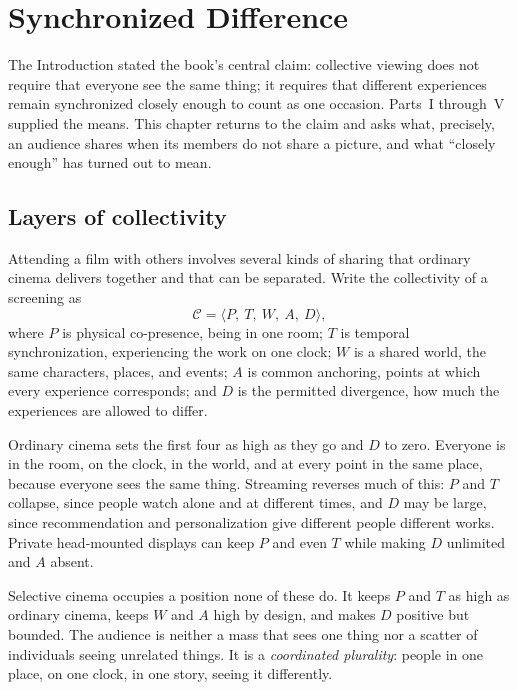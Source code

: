 \chapter{Synchronized Difference}\label{ch:synchronized-difference}

The Introduction stated the book's central claim: collective viewing does not require that everyone see the same thing; it requires that different experiences remain synchronized closely enough to count as one occasion. Parts~I through~V supplied the means. This chapter returns to the claim and asks what, precisely, an audience shares when its members do not share a picture, and what ``closely enough'' has turned out to mean.

\section{Layers of collectivity}

Attending a film with others involves several kinds of sharing that ordinary cinema delivers together and that can be separated. Write the collectivity of a screening as
\begin{equation}
\mathcal C=\langle P,\ T,\ W,\ A,\ D\rangle,
\end{equation}
where $P$ is physical co-presence, being in one room; $T$ is temporal synchronization, experiencing the work on one clock; $W$ is a shared world, the same characters, places, and events; $A$ is common anchoring, points at which every experience corresponds; and $D$ is the permitted divergence, how much the experiences are allowed to differ.

Ordinary cinema sets the first four as high as they go and $D$ to zero. Everyone is in the room, on the clock, in the world, and at every point in the same place, because everyone sees the same thing. Streaming reverses much of this: $P$ and $T$ collapse, since people watch alone and at different times, and $D$ may be large, since recommendation and personalization give different people different works. Private head-mounted displays can keep $P$ and even $T$ while making $D$ unlimited and $A$ absent.

Selective cinema occupies a position none of these do. It keeps $P$ and $T$ as high as ordinary cinema, keeps $W$ and $A$ high by design, and makes $D$ positive but bounded. The audience is neither a mass that sees one thing nor a scatter of individuals seeing unrelated things. It is a \emph{coordinated plurality}: people in one place, on one clock, in one story, seeing it differently.

